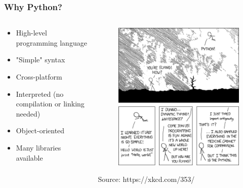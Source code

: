 \documentclass[10pt, a4paper]{beamer} %
\begin{document}
\begin{frame}[c]\frametitle{Why Python?}
    \begin{columns}
        \begin{column}{0.5\textwidth}
           \begin{itemize}
                \item High-level programming language
                \item "Simple" syntax
                \item Cross-platform
                \item Interpreted (no compilation or linking needed)
                \item Object-oriented
                \item Many libraries available
            \end{itemize}
        \end{column}
        \begin{column}{0.5\textwidth}  %
            \begin{figure}
                \includegraphics[width=0.9\linewidth]{pics/python.png}
            \end{figure}
            \tiny Source: https://xkcd.com/353/
        \end{column}
    \end{columns}

\end{frame}
\end{document}

